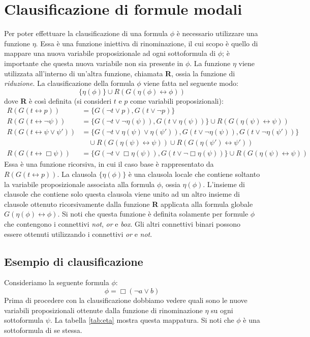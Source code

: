 \documentclass[a4paper,12pt]{report}
\newcommand{\tto} {\leftrightarrow}
\begin{document}
\section{Clausificazione di formule modali}
\label{modal_claus}
Per poter effettuare la clausificazione di una formula $\phi$ è necessario utilizzare una funzione $\eta$. Essa è una funzione iniettiva di rinominazione, il cui scopo è quello di mappare una nuova variabile proposizionale ad ogni sottoformula di $\phi$; è importante che questa nuova variabile non sia presente in $\phi$. La funzione $\eta$ viene utilizzata all'interno di un'altra funzione, chiamata \textbf{R}, ossia la funzione di \emph{riduzione}. La clausificazione della formula $\phi$ viene fatta nel seguente modo:
\[ \{ \eta(\phi) \} \cup R(G(\eta(\phi) \tto \phi)) \]
dove \textbf{R} è così definita (si consideri $t$ e $p$ come variabili proposizionali):
\[
\begin{aligned}
R(G(t \tto p)) &= \{ G(\lnot t \lor p), G(t \lor \lnot p) \} \\
R(G(t \tto \lnot \psi)) &= \{ G(\lnot t \lor \lnot \eta(\psi)), G(t \lor \eta(\psi)) \} \cup R(G(\eta(\psi) \tto \psi)) \\
R(G(t \tto \psi \lor \psi')) &= \{ G(\lnot t \lor \eta(\psi) \lor \eta(\psi')), G(t \lor \lnot \eta(\psi)), G(t \lor \lnot \eta(\psi')) \} \\
& \quad \cup R(G(\eta(\psi) \tto \psi)) \cup R(G(\eta(\psi') \tto \psi')) \\
R(G(t \tto \Box \psi)) &= \{ G(\lnot t \lor \Box \eta(\psi)), G(t \lor \lnot \Box \eta(\psi)) \} \cup R(G(\eta(\psi) \tto \psi))
\end{aligned}
\]
Essa è una funzione ricorsiva, in cui il caso base è rappresentato da $R(G(t \tto p))$. La clausola $\{\eta(\phi)\}$ è una clausola locale che contiene soltanto la variabile proposizionale associata alla formula $\phi$, ossia $\eta(\phi)$. L'insieme di clausole che contiene solo questa clausola viene unito ad un altro insieme di clausole ottenuto ricorsivamente dalla funzione \textbf{R} applicata alla formula globale $G(\eta(\phi) \tto \phi)$. Si noti che questa funzione è definita solamente per formule $\phi$ che contengono i connettivi \emph{not}, \emph{or} e \emph{box}. Gli altri connettivi binari possono essere ottenuti utilizzando i connettivi \emph{or} e \emph{not}.

\subsection*{Esempio di clausificazione}
Consideriamo la seguente formula $\phi$:
\[
    \phi = \Box(\lnot a \lor b)
\]
Prima di procedere con la clausificazione dobbiamo vedere quali sono le nuove variabili proposizionali ottenute dalla funzione di rinominazione $\eta$ su ogni sottoformula $\psi$. La tabella \ref{tab:eta} mostra questa mappatura. Si noti che $\phi$ è una sottoformula di se stessa.
\end{document}
